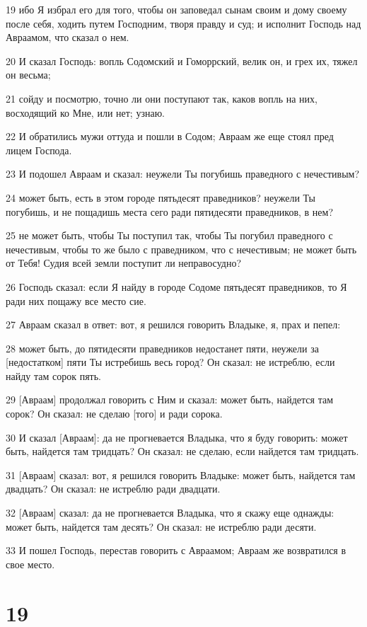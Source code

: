 \par 19 ибо Я избрал его для того, чтобы он заповедал сынам своим и дому своему после себя, ходить путем Господним, творя правду и суд; и исполнит Господь над Авраамом, что сказал о нем.
\par 20 И сказал Господь: вопль Содомский и Гоморрский, велик он, и грех их, тяжел он весьма;
\par 21 сойду и посмотрю, точно ли они поступают так, каков вопль на них, восходящий ко Мне, или нет; узнаю.
\par 22 И обратились мужи оттуда и пошли в Содом; Авраам же еще стоял пред лицем Господа.
\par 23 И подошел Авраам и сказал: неужели Ты погубишь праведного с нечестивым?
\par 24 может быть, есть в этом городе пятьдесят праведников? неужели Ты погубишь, и не пощадишь места сего ради пятидесяти праведников, в нем?
\par 25 не может быть, чтобы Ты поступил так, чтобы Ты погубил праведного с нечестивым, чтобы то же было с праведником, что с нечестивым; не может быть от Тебя! Судия всей земли поступит ли неправосудно?
\par 26 Господь сказал: если Я найду в городе Содоме пятьдесят праведников, то Я ради них пощажу все место сие.
\par 27 Авраам сказал в ответ: вот, я решился говорить Владыке, я, прах и пепел:
\par 28 может быть, до пятидесяти праведников недостанет пяти, неужели за [недостатком] пяти Ты истребишь весь город? Он сказал: не истреблю, если найду там сорок пять.
\par 29 [Авраам] продолжал говорить с Ним и сказал: может быть, найдется там сорок? Он сказал: не сделаю [того] и ради сорока.
\par 30 И сказал [Авраам]: да не прогневается Владыка, что я буду говорить: может быть, найдется там тридцать? Он сказал: не сделаю, если найдется там тридцать.
\par 31 [Авраам] сказал: вот, я решился говорить Владыке: может быть, найдется там двадцать? Он сказал: не истреблю ради двадцати.
\par 32 [Авраам] сказал: да не прогневается Владыка, что я скажу еще однажды: может быть, найдется там десять? Он сказал: не истреблю ради десяти.
\par 33 И пошел Господь, перестав говорить с Авраамом; Авраам же возвратился в свое место.

\chapter{19}

